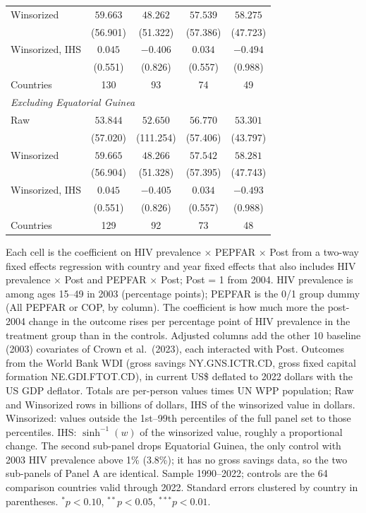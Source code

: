 \begin{table}[htbp]
\begin{tabular}{lcccc}
Winsorized & $59.663$ & $48.262$ & $57.539$ & $58.275$ \\
 & (56.901) & (51.322) & (57.386) & (47.723) \\
Winsorized, IHS & $0.045$ & $-0.406$ & $0.034$ & $-0.494$ \\
 & (0.551) & (0.826) & (0.557) & (0.988) \\
Countries & 130 & 93 & 74 & 49 \\
\multicolumn{5}{l}{\textit{Excluding Equatorial Guinea}} \\
Raw & $53.844$ & $52.650$ & $56.770$ & $53.301$ \\
 & (57.020) & (111.254) & (57.406) & (43.797) \\
Winsorized & $59.665$ & $48.266$ & $57.542$ & $58.281$ \\
 & (56.904) & (51.328) & (57.395) & (47.743) \\
Winsorized, IHS & $0.045$ & $-0.405$ & $0.034$ & $-0.493$ \\
 & (0.551) & (0.826) & (0.557) & (0.988) \\
Countries & 129 & 92 & 73 & 48 \\
\bottomrule
\end{tabular}
\par\vspace{4pt}
\begin{minipage}{\textwidth}\footnotesize Each cell is the coefficient on HIV prevalence $\times$ PEPFAR $\times$ Post from a two-way fixed effects regression with country and year fixed effects that also includes HIV prevalence $\times$ Post and PEPFAR $\times$ Post; Post = 1 from 2004. HIV prevalence is among ages 15--49 in 2003 (percentage points); PEPFAR is the 0/1 group dummy (All PEPFAR or COP, by column). The coefficient is how much more the post-2004 change in the outcome rises per percentage point of HIV prevalence in the treatment group than in the controls. Adjusted columns add the other 10 baseline (2003) covariates of Crown et al.\ (2023), each interacted with Post. Outcomes from the World Bank WDI (gross savings NY.GNS.ICTR.CD, gross fixed capital formation NE.GDI.FTOT.CD), in current US\$ deflated to 2022 dollars with the US GDP deflator. Totals are per-person values times UN WPP population; Raw and Winsorized rows in billions of dollars, IHS of the winsorized value in dollars. Winsorized: values outside the 1st--99th percentiles of the full panel set to those percentiles. IHS: $\sinh^{-1}(w)$ of the winsorized value, roughly a proportional change. The second sub-panel drops Equatorial Guinea, the only control with 2003 HIV prevalence above 1\% (3.8\%); it has no gross savings data, so the two sub-panels of Panel A are identical. Sample 1990--2022; controls are the 64 comparison countries valid through 2022. Standard errors clustered by country in parentheses. $^{*}p<0.10$, $^{**}p<0.05$, $^{***}p<0.01$.\end{minipage}
\end{table}
